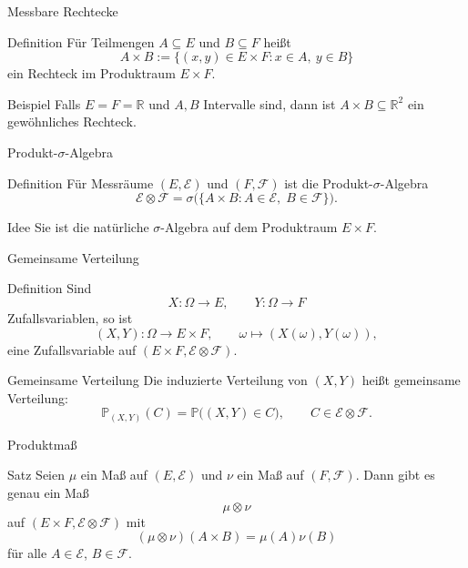 \documentclass{beamer}
\begin{document}
\begin{frame}{Messbare Rechtecke}
\begin{block}{Definition}
Für Teilmengen \(A\subseteq E\) und \(B\subseteq F\) hei\ss{}t
\[
A\times B:=\{(x,y)\in E\times F : x\in A,\ y\in B\}
\]
ein Rechteck im Produktraum \(E\times F\).
\end{block}

\begin{block}{Beispiel}
Falls \(E=F=\mathbb R\) und \(A,B\) Intervalle sind, dann ist \(A\times B\subseteq\mathbb R^2\)
ein gewöhnliches Rechteck.
\end{block}
\end{frame}

\begin{frame}{Produkt-\(\sigma\)-Algebra}
\begin{block}{Definition}
Für Messräume \((E,\mathcal E)\) und \((F,\mathcal F)\) ist die Produkt-\(\sigma\)-Algebra
\[
\mathcal E\otimes\mathcal F
=
\sigma\bigl(\{A\times B : A\in\mathcal E,\; B\in\mathcal F\}\bigr).
\]
\end{block}

\begin{block}{Idee}
Sie ist die natürliche \(\sigma\)-Algebra auf dem Produktraum \(E\times F\).
\end{block}
\end{frame}

\begin{frame}{Gemeinsame Verteilung}
\begin{block}{Definition}
Sind
\[
X\colon \Omega\to E,
\qquad
Y\colon \Omega\to F
\]
Zufallsvariablen, so ist
\[
(X,Y)\colon \Omega\to E\times F,
\qquad
\omega\mapsto (X(\omega),Y(\omega)),
\]
eine Zufallsvariable auf \((E\times F,\mathcal E\otimes\mathcal F)\).
\end{block}

\begin{block}{Gemeinsame Verteilung}
Die induzierte Verteilung von \((X,Y)\) hei\ss{}t gemeinsame Verteilung:
\[
\mathbb P_{(X,Y)}(C)=\mathbb P\bigl((X,Y)\in C\bigr),
\qquad
C\in\mathcal E\otimes\mathcal F.
\]
\end{block}
\end{frame}

\begin{frame}{Produktmaß}
\begin{block}{Satz}
Seien \(\mu\) ein Maß auf \((E,\mathcal E)\) und \(\nu\) ein Maß auf \((F,\mathcal F)\).
Dann gibt es genau ein Maß
\[
\mu\otimes\nu
\]
auf \((E\times F,\mathcal E\otimes\mathcal F)\) mit
\[
(\mu\otimes\nu)(A\times B)=\mu(A)\nu(B)
\]
für alle \(A\in\mathcal E\), \(B\in\mathcal F\).
\end{block}
\end{frame}
\end{document}
